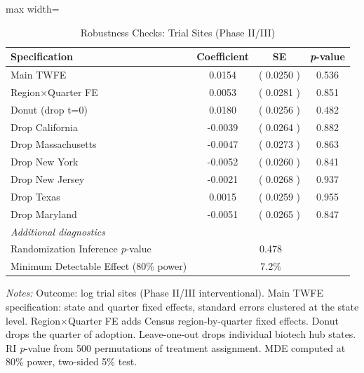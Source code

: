 \begin{table}[htbp]
\centering
\caption{Robustness Checks: Trial Sites (Phase II/III)}
\label{tab:robust}
\begin{adjustbox}{max width=\textwidth}
\begin{tabular}{lccc}
\hline\hline
Specification & Coefficient & SE & \textit{p}-value \\
\hline
Main TWFE  &  0.0154  & ( 0.0250 ) &  0.536  \\
Region×Quarter FE  &  0.0053  & ( 0.0281 ) &  0.851  \\
Donut (drop t=0)  &  0.0180  & ( 0.0256 ) &  0.482  \\
Drop California  &  -0.0039  & ( 0.0264 ) &  0.882  \\
Drop Massachusetts  &  -0.0047  & ( 0.0273 ) &  0.863  \\
Drop New York  &  -0.0052  & ( 0.0260 ) &  0.841  \\
Drop New Jersey  &  -0.0021  & ( 0.0268 ) &  0.937  \\
Drop Texas  &  0.0015  & ( 0.0259 ) &  0.955  \\
Drop Maryland  &  -0.0051  & ( 0.0265 ) &  0.847  \\
\hline
\multicolumn{4}{l}{\textit{Additional diagnostics}} \\
Randomization Inference \textit{p}-value & \multicolumn{3}{c}{ 0.478 } \\
Minimum Detectable Effect (80\% power) & \multicolumn{3}{c}{ 7.2\% } \\
\hline\hline
\end{tabular}
\end{adjustbox}
\begin{minipage}{0.95\textwidth}
\footnotesize \textit{Notes:} Outcome: log trial sites (Phase II/III interventional). Main TWFE specification: state and quarter fixed effects, standard errors clustered at the state level. Region$\times$Quarter FE adds Census region-by-quarter fixed effects. Donut drops the quarter of adoption. Leave-one-out drops individual biotech hub states. RI \textit{p}-value from 500 permutations of treatment assignment. MDE computed at 80\% power, two-sided 5\% test.
\end{minipage}
\end{table}
